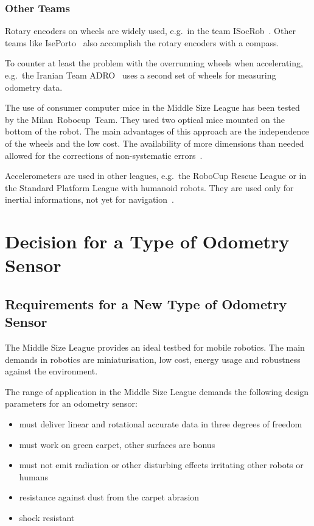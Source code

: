 \documentclass[12pt,a4paper]{article}
\newcommand{\MSL}{Middle Size League\xspace}
\begin{document}
\subsubsection{Other Teams}

Rotary encoders on wheels are widely used, e.g.\ in the team ISocRob~\cite{isocrob}.
Other teams like IsePorto~\cite{iseporto} also accomplish the rotary encoders with a compass.

To counter at least the problem with the overrunning wheels when accelerating, e.g.\ the Iranian Team ADRO~\cite{adro} uses a second set of wheels for measuring odometry data.

The use of consumer computer mice in the \MSL has been tested by the Milan~Robocup~Team.
They used two optical mice mounted on the bottom of the robot.
The main advantages of this approach are the independence of the wheels and the low cost.
The availability of more dimensions than needed allowed for the corrections of non-systematic errors~\cite{two_mice}.

Accelerometers are used in other leagues, e.g.\ the RoboCup Rescue League or in the Standard Platform League with humanoid robots.
They are used only for inertial informations, not yet for navigation~\cite{zadeat}.

\clearpage
\section{Decision for a Type of Odometry Sensor}
\label{decision}


\subsection{Requirements for a New Type of Odometry Sensor}

The \MSL provides an ideal testbed for mobile robotics.
The main demands in robotics are miniaturisation, low cost, energy usage and robustness against the environment.

The range of application in the \MSL demands the following design parameters for an odometry sensor: %
\begin{itemize}
  \item must deliver linear and rotational accurate data in three degrees of freedom
  \item must work on green carpet, other surfaces are bonus
  \item must not emit radiation or other disturbing effects irritating other robots or humans
  \item resistance against dust from the carpet abrasion
  \item shock resistant
\end{itemize}
\end{document}
